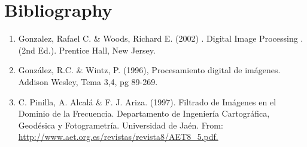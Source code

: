 \documentclass[a4paper]{article}
\begin{document}
\section{Bibliography}
\begin{enumerate}
\item Gonzalez, Rafael C. \& Woods, Richard E. (2002) . Digital Image Processing . (2nd Ed.). Prentice Hall, New Jersey.

\item González, R.C. \& Wintz, P. (1996), Procesamiento digital de imágenes. Addison Wesley, Tema 3,4, pg 89-269.

\item C. Pinilla, A. Alcalá \& F. J. Ariza. (1997). Filtrado de Imágenes en el Dominio de la Frecuencia. Departamento de Ingeniería Cartográfica, Geodésica y Fotogrametría. Universidad de Jaén. From: \url{ http://www.aet.org.es/revistas/revista8/AET8_5.pdf.}
\end{enumerate}
\end{document}
